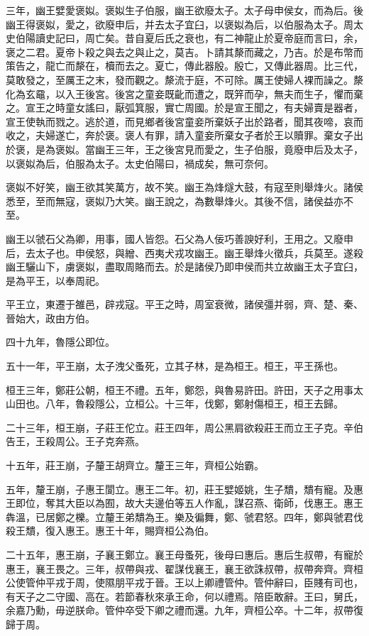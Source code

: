 三年，幽王嬖愛褒姒。褒姒生子伯服，幽王欲廢太子。太子母申侯女，而為后。後幽王得褒姒，愛之，欲廢申后，并去太子宜臼，以褒姒為后，以伯服為太子。周太史伯陽讀史記曰，周亡矣。昔自夏后氏之衰也，有二神龍止於夏帝庭而言曰，余，褒之二君。夏帝卜殺之與去之與止之，莫吉。卜請其漦而藏之，乃吉。於是布幣而策告之，龍亡而漦在，櫝而去之。夏亡，傳此器殷。殷亡，又傳此器周。比三代，莫敢發之，至厲王之末，發而觀之。漦流于庭，不可除。厲王使婦人裸而譟之。漦化為玄黿，以入王後宮。後宮之童妾既齔而遭之，既笄而孕，無夫而生子，懼而棄之。宣王之時童女謠曰，厭弧箕服，實亡周國。於是宣王聞之，有夫婦賣是器者，宣王使執而戮之。逃於道，而見鄉者後宮童妾所棄妖子出於路者，聞其夜啼，哀而收之，夫婦遂亡，奔於褒。褒人有罪，請入童妾所棄女子者於王以贖罪。棄女子出於褒，是為褒姒。當幽王三年，王之後宮見而愛之，生子伯服，竟廢申后及太子，以褒姒為后，伯服為太子。太史伯陽曰，禍成矣，無可奈何。

褒姒不好笑，幽王欲其笑萬方，故不笑。幽王為烽燧大鼓，有寇至則舉烽火。諸侯悉至，至而無寇，褒姒乃大笑。幽王說之，為數舉烽火。其後不信，諸侯益亦不至。

幽王以虢石父為卿，用事，國人皆怨。石父為人佞巧善諛好利，王用之。又廢申后，去太子也。申侯怒，與繒、西夷犬戎攻幽王。幽王舉烽火徵兵，兵莫至。遂殺幽王驪山下，虜褒姒，盡取周賂而去。於是諸侯乃即申侯而共立故幽王太子宜臼，是為平王，以奉周祀。

平王立，東遷于雒邑，辟戎寇。平王之時，周室衰微，諸侯彊并弱，齊、楚、秦、晉始大，政由方伯。

四十九年，魯隱公即位。

五十一年，平王崩，太子洩父蚤死，立其子林，是為桓王。桓王，平王孫也。

桓王三年，鄭莊公朝，桓王不禮。五年，鄭怨，與魯易許田。許田，天子之用事太山田也。八年，魯殺隱公，立桓公。十三年，伐鄭，鄭射傷桓王，桓王去歸。

二十三年，桓王崩，子莊王佗立。莊王四年，周公黑肩欲殺莊王而立王子克。辛伯告王，王殺周公。王子克奔燕。

十五年，莊王崩，子釐王胡齊立。釐王三年，齊桓公始霸。

五年，釐王崩，子惠王閬立。惠王二年。初，莊王嬖姬姚，生子穨，穨有寵。及惠王即位，奪其大臣以為囿，故大夫邊伯等五人作亂，謀召燕、衛師，伐惠王。惠王犇溫，已居鄭之櫟。立釐王弟穨為王。樂及徧舞，鄭、虢君怒。四年，鄭與虢君伐殺王穨，復入惠王。惠王十年，賜齊桓公為伯。

二十五年，惠王崩，子襄王鄭立。襄王母蚤死，後母曰惠后。惠后生叔帶，有寵於惠王，襄王畏之。三年，叔帶與戎、翟謀伐襄王，襄王欲誅叔帶，叔帶奔齊。齊桓公使管仲平戎于周，使隰朋平戎于晉。王以上卿禮管仲。管仲辭曰，臣賤有司也，有天子之二守國、高在。若節春秋來承王命，何以禮焉。陪臣敢辭。王曰，舅氏，余嘉乃勳，毋逆朕命。管仲卒受下卿之禮而還。九年，齊桓公卒。十二年，叔帶復歸于周。

